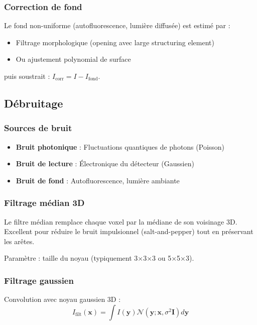 \subsubsection{Correction de fond}

Le fond non-uniforme (autofluorescence, lumière diffusée) est estimé par :
\begin{itemize}
    \item Filtrage morphologique (opening avec large structuring element)
    \item Ou ajustement polynomial de surface
\end{itemize}

puis soustrait : $I_{\text{corr}} = I - I_{\text{fond}}$.

\subsection{Débruitage}

\subsubsection{Sources de bruit}

\begin{itemize}
    \item \textbf{Bruit photonique} : Fluctuations quantiques de photons (Poisson)
    \item \textbf{Bruit de lecture} : Électronique du détecteur (Gaussien)
    \item \textbf{Bruit de fond} : Autofluorescence, lumière ambiante
\end{itemize}

\subsubsection{Filtrage médian 3D}

Le filtre médian remplace chaque voxel par la médiane de son voisinage 3D. Excellent pour réduire le bruit impulsionnel (salt-and-pepper) tout en préservant les arêtes.

Paramètre : taille du noyau (typiquement 3×3×3 ou 5×5×3).

\subsubsection{Filtrage gaussien}

Convolution avec noyau gaussien 3D :
\[
I_{\text{filt}}(\mathbf{x}) = \int I(\mathbf{y}) \mathcal{N}(\mathbf{y}; \mathbf{x}, \sigma^2 \mathbf{I}) d\mathbf{y}
\]

